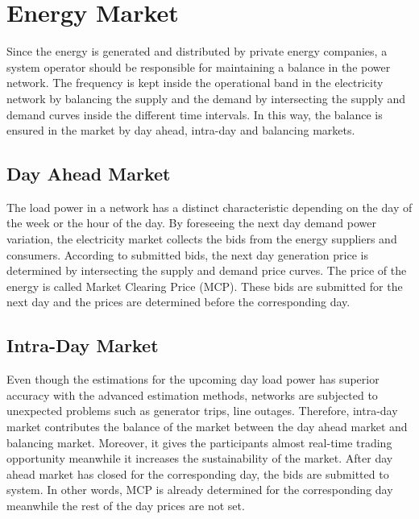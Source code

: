 \section{Energy Market}
Since the energy is generated and distributed by private energy companies, a system operator should be responsible for maintaining a balance in the power network. The frequency is kept inside the operational band in the electricity network by balancing the supply and the demand by intersecting the supply and demand curves inside the different time intervals. In this way, the balance is ensured in the market by day ahead, intra-day and balancing markets. 
\subsection{Day Ahead Market}
The load power in a network has a distinct characteristic depending on the day of the week or the hour of the day. By foreseeing the next day demand power variation, the electricity market collects the bids from the energy suppliers and consumers. According to submitted bids, the next day generation price is determined by intersecting the supply and demand price curves. The price of the energy is called Market Clearing Price (MCP). These bids are submitted for the next day and the prices are determined before the corresponding day.
\subsection{Intra-Day Market}
Even though the estimations for the upcoming day load power has superior accuracy with the advanced estimation methods, networks are subjected to unexpected problems such as generator trips, line outages. Therefore, intra-day market contributes the balance of the market between the day ahead market and balancing market. Moreover, it gives the participants almost real-time trading opportunity meanwhile it increases the sustainability of the market. After day ahead market has closed for the corresponding day, the bids are submitted to system. In other words, MCP is already determined for the corresponding day meanwhile the rest of the day prices are not set. 

